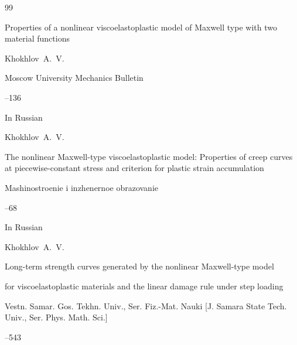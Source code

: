 \begin{thebibliography}{99}




\paper Properties of a nonlinear viscoelastoplastic model of Maxwell type with two material functions

\by  Khokhlov~A.~V.

\jour Moscow University Mechanics Bulletin




--136






\lang In Russian

\by Khokhlov~A.~V.

\paper The nonlinear Maxwell-type viscoelastoplastic model: Properties of creep curves at piecewise-constant stress and criterion for plastic strain accumulation

\jour Mashinostroenie i inzhenernoe obrazovanie



--68






\lang In Russian

\by Khokhlov~A.~V.

\paper Long-term strength curves generated by the nonlinear Maxwell-type model

for viscoelastoplastic materials and the linear damage rule under step loading

\jour Vestn. Samar. Gos. Tekhn. Univ., Ser. Fiz.-Mat. Nauki \rm [J. Samara State Tech. Univ., Ser. Phys. Math. Sci.]




--543








\end{thebibliography}
